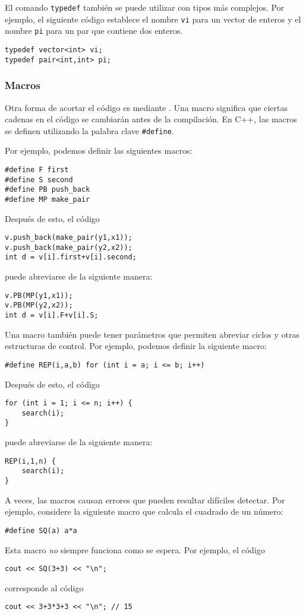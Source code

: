 El comando \texttt{typedef}
también se puede utilizar con tipos más complejos.
Por ejemplo, el siguiente código establece
el nombre \texttt{vi} para un vector de enteros
y el nombre \texttt{pi} para un par
que contiene dos enteros.
\begin{lstlisting}
typedef vector<int> vi;
typedef pair<int,int> pi;
\end{lstlisting}

\subsubsection{Macros}
Otra forma de acortar el código es mediante
.
Una macro significa que ciertas cadenas en
el código se cambiarán antes de la compilación.
En C++, las macros se definen utilizando la
palabra clave \texttt{\#define}.

Por ejemplo, podemos definir las siguientes macros:
\begin{lstlisting}
#define F first
#define S second
#define PB push_back
#define MP make_pair
\end{lstlisting}
Después de esto, el código
\begin{lstlisting}
v.push_back(make_pair(y1,x1));
v.push_back(make_pair(y2,x2));
int d = v[i].first+v[i].second;
\end{lstlisting}
puede abreviarse de la siguiente manera:
\begin{lstlisting}
v.PB(MP(y1,x1));
v.PB(MP(y2,x2));
int d = v[i].F+v[i].S;
\end{lstlisting}

Una macro también puede tener parámetros
que permiten abreviar ciclos y otras
estructuras de control.
Por ejemplo, podemos definir la siguiente macro:
\begin{lstlisting}
#define REP(i,a,b) for (int i = a; i <= b; i++)
\end{lstlisting}
Después de esto, el código
\begin{lstlisting}
for (int i = 1; i <= n; i++) {
    search(i);
}
\end{lstlisting}
puede abreviarse de la siguiente manera:
\begin{lstlisting}
REP(i,1,n) {
    search(i);
}
\end{lstlisting}

A veces, las macros causan errores que pueden resultar difíciles
detectar. Por ejemplo, considere la siguiente macro
que calcula el cuadrado de un número:
\begin{lstlisting}
#define SQ(a) a*a
\end{lstlisting}
Esta macro \emph{no} siempre funciona como se espera.
Por ejemplo, el código
\begin{lstlisting}
cout << SQ(3+3) << "\n";
\end{lstlisting}
corresponde al código
\begin{lstlisting}
cout << 3+3*3+3 << "\n"; // 15
\end{lstlisting}

